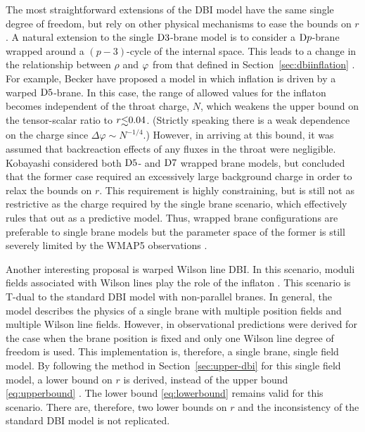 The most straightforward extensions of the DBI model have the same single degree of
freedom, but
rely on other physical mechanisms to ease the bounds on $r$.
A natural extension to the single ${\rm D3}$-brane model 
is to consider a ${\rm D}p$-brane wrapped around a $(p-3)$-cycle of the 
internal space.
This leads to a change in the relationship
between $\rho$ and $\varphi$ from that defined in Section~\ref{sec:dbiinflation}
\cite{Kobayashi:2007hm, Becker:2007ui, Ward:2007gs}.  
For example, Becker \etal \cite{Becker:2007ui} 
have proposed a model in which inflation is driven by a warped ${\rm D5}$-brane. 
In this case, the range of allowed values for the inflaton 
becomes independent of the throat charge, $N$, which weakens the upper bound on 
the tensor-scalar ratio to $r \lsim 0.04$. (Strictly speaking there is a weak
dependence on the charge since $\Delta \varphi \sim N^{-1/4}$.)
However, in arriving at this bound, it was assumed that 
backreaction effects of any fluxes in the throat were 
negligible. 
Kobayashi \etal \cite{Kobayashi:2007hm} 
considered both ${\rm D5}$- and
${\rm D7}$ wrapped brane models, but concluded that the former case
required an excessively large background charge in 
order to relax the bounds on $r$. 
% 
This requirement is highly constraining, but is
still not as restrictive as the charge required by the single brane scenario,
which effectively rules that out as a predictive model. 
% 
Thus, wrapped brane configurations are preferable to
single brane models but the parameter space of the former is still severely
limited by the WMAP5 observations \cite{Alabidi:2008ej}. 


Another interesting proposal is warped Wilson line DBI. In this scenario, moduli
fields associated with Wilson
lines play the role of the inflaton \cite{Avgoustidis:2008zu}. This scenario is
T-dual to the
standard DBI model with non-parallel branes. In general, the model describes the
physics of a single brane with multiple position fields and multiple Wilson line
fields.
% 
However, in  observational predictions were derived for
the case when the brane position is fixed and only one Wilson line degree of freedom
is used. This implementation is, therefore, a single brane, single field model.
% 
By following the method in Section~\ref{sec:upper-dbi} for this single field model,
a lower bound on $r$ is derived, instead of the upper bound \eqref{eq:upperbound}
\cite{Avgoustidis:2008zu}. The lower bound \eqref{eq:lowerbound} remains valid for
this scenario. 
% 
There are, therefore, two lower bounds on $r$ and the inconsistency of the
standard DBI model is not replicated. 
 



